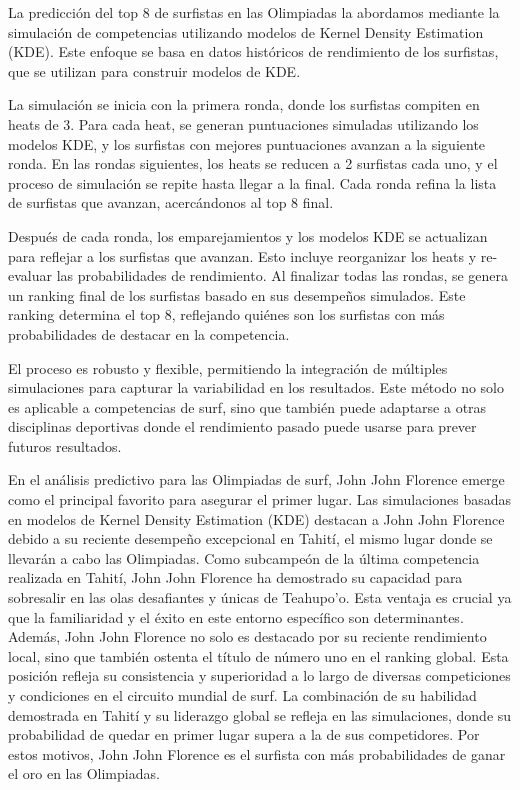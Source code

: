 \documentclass[12pt]{article}
\begin{document}
La predicción del top 8 de surfistas en las Olimpiadas la abordamos mediante la simulación de competencias utilizando modelos de Kernel Density Estimation (KDE). Este enfoque se basa en datos históricos de rendimiento de los surfistas, que se utilizan para construir modelos de KDE. 

La simulación se inicia con la primera ronda, donde los surfistas compiten en heats de 3. Para cada heat, se generan puntuaciones simuladas utilizando los modelos KDE, y los surfistas con mejores puntuaciones avanzan a la siguiente ronda. En las rondas siguientes, los heats se reducen a 2 surfistas cada uno, y el proceso de simulación se repite hasta llegar a la final. Cada ronda refina la lista de surfistas que avanzan, acercándonos al top 8 final.

Después de cada ronda, los emparejamientos y los modelos KDE se actualizan para reflejar a los surfistas que avanzan. Esto incluye reorganizar los heats y re-evaluar las probabilidades de rendimiento. Al finalizar todas las rondas, se genera un ranking final de los surfistas basado en sus desempeños simulados. Este ranking determina el top 8, reflejando quiénes son los surfistas con más probabilidades de destacar en la competencia.

El proceso es robusto y flexible, permitiendo la integración de múltiples simulaciones para capturar la variabilidad en los resultados. Este método no solo es aplicable a competencias de surf, sino que también puede adaptarse a otras disciplinas deportivas donde el rendimiento pasado puede usarse para prever futuros resultados.

En el análisis predictivo para las Olimpiadas de surf, John John Florence emerge como el principal favorito para asegurar el primer lugar. Las simulaciones basadas en modelos de Kernel Density Estimation (KDE) destacan a John John Florence debido a su reciente desempeño excepcional en Tahití, el mismo lugar donde se llevarán a cabo las Olimpiadas. Como subcampeón de la última competencia realizada en Tahití, John John Florence ha demostrado su capacidad para sobresalir en las olas desafiantes y únicas de Teahupo'o. Esta ventaja es crucial ya que la familiaridad y el éxito en este entorno específico son determinantes. Además, John John Florence no solo es destacado por su reciente rendimiento local, sino que también ostenta el título de número uno en el ranking global. Esta posición refleja su consistencia y superioridad a lo largo de diversas competiciones y condiciones en el circuito mundial de surf. La combinación de su habilidad demostrada en Tahití y su liderazgo global se refleja en las simulaciones, donde su probabilidad de quedar en primer lugar supera a la de sus competidores. Por estos motivos, John John Florence es el surfista con más probabilidades de ganar el oro en las Olimpiadas.
\end{document}
